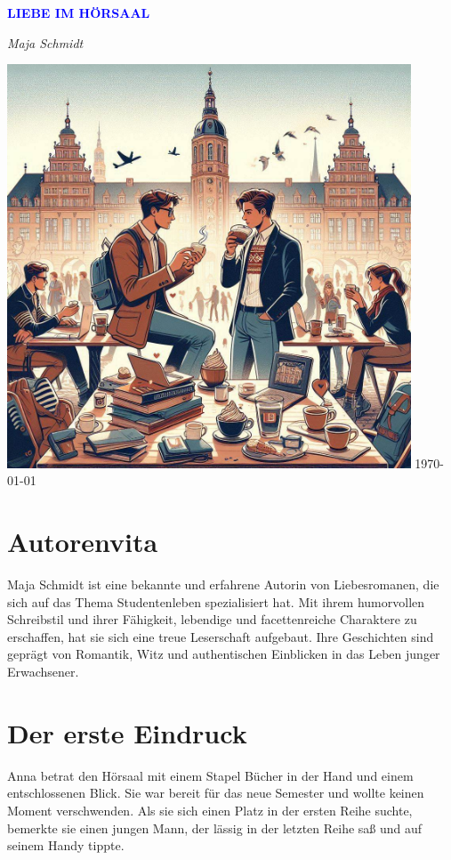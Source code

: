 \documentclass[12pt]{article}
\begin{document}
\begin{titlepage}
    \centering
    \vspace*{3cm}
    {\Huge\bfseries\textcolor{blue}{\MakeUppercase{ Liebe im Hörsaal }}\par}
    \vspace{0.5cm}
    {\Large\textit{ Maja Schmidt }\par}
    \vfill
    \includegraphics[width=0.9\textwidth]{ cover.jpg }
    \vfill
    \today
\end{titlepage}

\section*{Autorenvita}
\vspace{4cm}
Maja Schmidt ist eine bekannte und erfahrene Autorin von Liebesromanen, die sich auf das Thema Studentenleben spezialisiert hat. Mit ihrem humorvollen Schreibstil und ihrer Fähigkeit, lebendige und facettenreiche Charaktere zu erschaffen, hat sie sich eine treue Leserschaft aufgebaut. Ihre Geschichten sind geprägt von Romantik, Witz und authentischen Einblicken in das Leben junger Erwachsener.

\clearpage
\tableofcontents
\clearpage


\section{ Der erste Eindruck }
 Anna betrat den Hörsaal mit einem Stapel Bücher in der Hand und einem entschlossenen Blick. Sie war bereit für das neue Semester und wollte keinen Moment verschwenden. Als sie sich einen Platz in der ersten Reihe suchte, bemerkte sie einen jungen Mann, der lässig in der letzten Reihe saß und auf seinem Handy tippte. 
\end{document}
